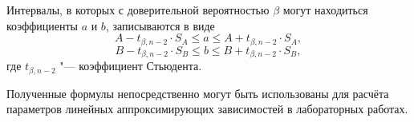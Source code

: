 \documentclass[a4paper, 12pt]{extarticle}
\begin{document}
Интервалы, в которых с доверительной вероятностью $\beta$ могут находиться коэффициенты $a$ и $b$, записываются в виде
\begin{equation}
\label{eq:m11-range-1}
A - t_{\beta, n - 2} \cdot S_A \le a \le A + t_{\beta, n - 2} \cdot S_A,
\end{equation}
\begin{equation}
\label{eq:m11-range-2}
B - t_{\beta, n - 2} \cdot S_B \le b \le B + t_{\beta, n - 2} \cdot S_B,
\end{equation}
где $t_{\beta, n-2}$ "--- коэффициент Стьюдента. 

Полученные формулы непосредственно могут быть использованы для расчёта параметров линейных аппроксимирующих зависимостей в лабораторных работах. 
\end{document}
